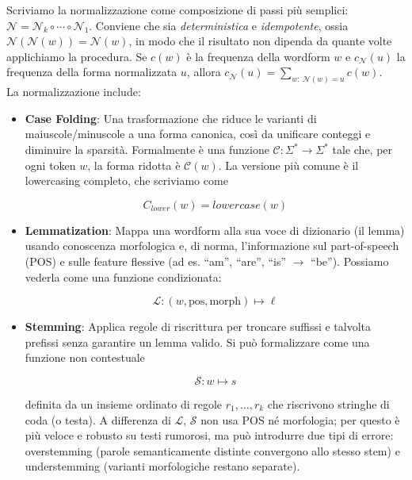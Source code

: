             Scriviamo la normalizzazione come composizione di passi pi\`u semplici: $\mathcal{N} = \mathcal{N}_k \circ \cdots \circ \mathcal{N}_1$. Conviene che sia \emph{deterministica} e \emph{idempotente}, ossia $\mathcal{N}(\mathcal{N}(w)) = \mathcal{N}(w)$, in modo che il risultato non dipenda da quante volte applichiamo la procedura. Se $c(w)$ \`e la frequenza della wordform $w$ e $c_{\mathcal{N}}(u)$ la frequenza della forma normalizzata $u$, allora $c_{\mathcal{N}}(u) = \sum_{w:\ \mathcal{N}(w)=u} c(w)$.\\

            La normalizzazione include:

            \begin{itemize}
            
                \item \textbf{Case Folding}: Una trasformazione che riduce le varianti di maiuscole/minuscole a una forma canonica, così da unificare conteggi e diminuire la sparsità. Formalmente è una funzione $\mathcal{C}:\Sigma^*\to\Sigma^*$ tale che, per ogni token $w$, la forma ridotta è $\mathcal{C}(w)$. La versione più comune è il lowercasing completo, che scriviamo come

                $$
                C_{lower}(w)=lowercase(w)
                $$
            
                \item \textbf{Lemmatization}: Mappa una wordform alla sua voce di dizionario (il lemma) usando conoscenza morfologica e, di norma, l’informazione sul part-of-speech (POS) e sulle feature flessive (ad es. ``am'', ``are'', ``is'' $\to$ ``be''). Possiamo vederla come una funzione condizionata:

                $$
                \mathcal{L}:(w,\text{pos},\text{morph}) \mapsto \ell
                $$
            
                \item \textbf{Stemming}: Applica regole di riscrittura per troncare suffissi e talvolta prefissi senza garantire un lemma valido. Si può formalizzare come una funzione non contestuale

                $$
                \mathcal{S}:w \mapsto s
                $$

                definita da un insieme ordinato di regole $r_1,\dots,r_k$ che riscrivono stringhe di coda (o testa). A differenza di $\mathcal{L}$, $\mathcal{S}$ non usa POS né morfologia; per questo è più veloce e robusto su testi rumorosi, ma può introdurre due tipi di errore: overstemming (parole semanticamente distinte convergono allo stesso stem) e understemming (varianti morfologiche restano separate).
            

\end{itemize}

